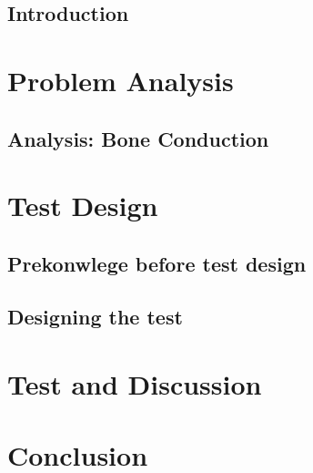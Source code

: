 \glsresetall
 \graphicspath{{figures/analysing/}}
\chapter{Introduction}\label{ch:intro}



\part{Problem Analysis}\label{pt:analysis} \glsresetall
\graphicspath{{figures/analysis/}}
\chapter{Analysis: Bone Conduction}\label{ch:bone_conductors}







\part{Test Design}\label{pt:design} 
\graphicspath{{figures/design/}}	
\chapter{Prekonwlege before test design}\label{ch:test_methopd}




\chapter{Designing the test}\label{ch:test_design}



\part{Test and Discussion}\label{pt:test}
\graphicspath{{figures/tests/}}


 
\part{Conclusion}\label{pt:conclusion}



\glsresetall
\appendix %

